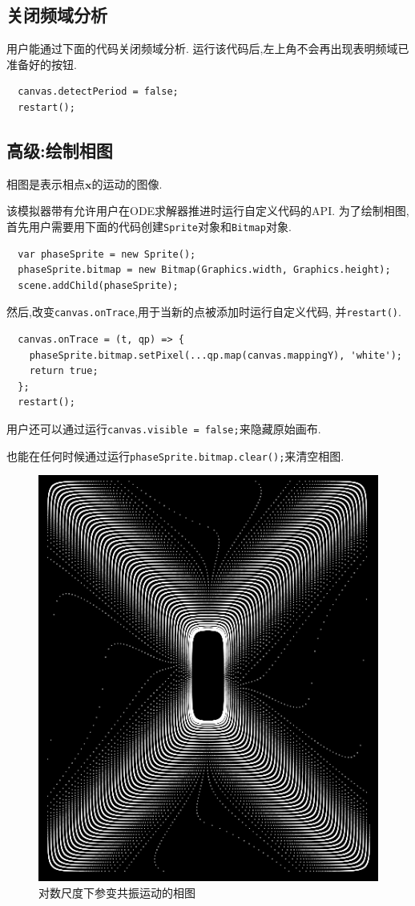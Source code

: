 \documentclass[12pt]{article}
\begin{document}
\subsection{关闭频域分析}

用户能通过下面的代码关闭频域分析.
运行该代码后,左上角不会再出现表明频域已准备好的按钮.

\begin{verbatim}
  canvas.detectPeriod = false;
  restart();
\end{verbatim}

\subsection{高级:绘制相图}

相图是表示相点$\mathbf x$的运动的图像\cite[p. 146]{landau1976mechanics}\cite[p. 68]{arnold1989mathmech}.

该模拟器带有允许用户在ODE求解器推进时运行自定义代码的API.
为了绘制相图,首先用户需要用下面的代码创建\texttt{Sprite}对象和\texttt{Bitmap}对象.

\begin{verbatim}
  var phaseSprite = new Sprite();
  phaseSprite.bitmap = new Bitmap(Graphics.width, Graphics.height);
  scene.addChild(phaseSprite);
\end{verbatim}

然后,改变\texttt{canvas.onTrace},用于当新的点被添加时运行自定义代码,
并\texttt{restart()}.

\begin{verbatim}
  canvas.onTrace = (t, qp) => {
    phaseSprite.bitmap.setPixel(...qp.map(canvas.mappingY), 'white');
    return true;
  };
  restart();
\end{verbatim}

用户还可以通过运行\texttt{canvas.visible = false;}来隐藏原始画布.

也能在任何时候通过运行\texttt{phaseSprite.bitmap.clear();}来清空相图.

\begin{figure}
  \centering
  \includegraphics[width=0.3\linewidth]{parametric_resonance_logarithmic_phase.png}
  \caption{对数尺度下参变共振运动的相图}
  \label{fig:parametric_phase}
\end{figure}
\end{document}
